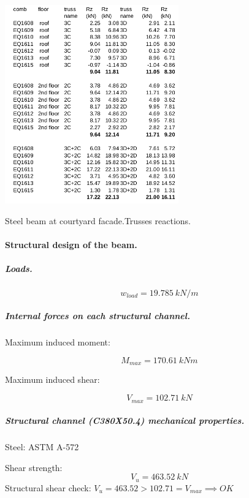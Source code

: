 \begin{table}
  \begin{center}
  \includegraphics[width=75mm]{figures/CD_reactions}
  \end{center}
  \caption{Steel beam at courtyard facade.Trusses reactions.}\label{tb_CD_reactions}
\end{table}

\paragraph{Structural design of the beam.}

\subparagraph{Loads.}

\begin{equation}
  w_{load}= 19.785\ kN/m
\end{equation}

\subparagraph{Internal forces on each structural channel.}

\noindent Maximum induced moment:

\begin{equation}
  M_{max}= 170.61\ kN m
\end{equation}

\noindent Maximum induced shear:

\begin{equation}
  V_{max}= 102.71\ kN
\end{equation}

\subparagraph{Structural channel (C380X50.4) mechanical properties.}
Steel: ASTM A-572

\noindent Shear strength:
\begin{equation}
  V_u= 463.52\ kN 
\end{equation}
\noindent Structural shear check: $V_u = 463.52 > 102.71 = V_{max} \implies OK$

